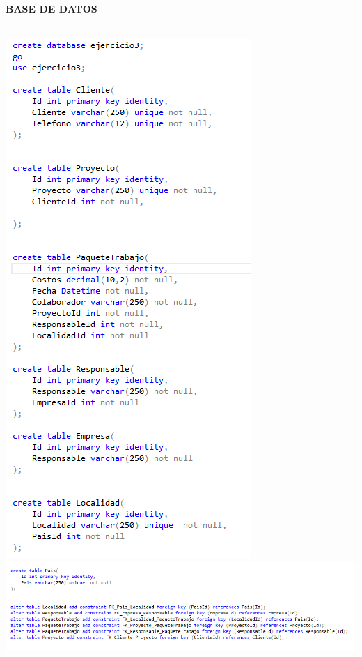 \documentclass[12pt,letterpaper]{article}
\begin{document}
\newpage
\textbf{BASE DE DATOS}\\\\
\begin{center} 
\includegraphics[scale=0.80]{imagenes/a5.png}\\
\includegraphics[width=14cm]{imagenes/a6.png}
\end{center} 
\end{document}
